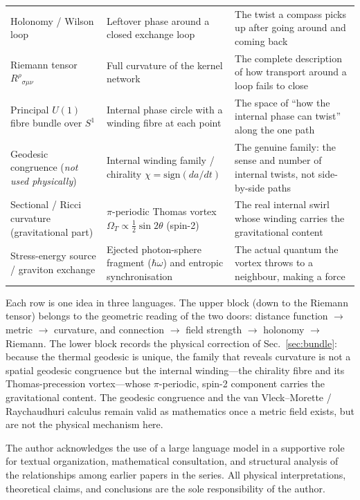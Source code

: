 \documentclass[%
 reprint, amsmath,amssymb, aps, prb, ]{revtex4-2}
\numberwithin{equation}{section}
\begin{document}
\begin{table}[t!]
\begin{tabular}{p{4.6cm}p{5.2cm}p{6.0cm}}
\addlinespace[0.2cm]
Holonomy / Wilson loop
& Leftover phase around a closed exchange loop
& The twist a compass picks up after going around and coming back \\
\addlinespace[0.2cm]
Riemann tensor $R^\rho{}_{\sigma\mu\nu}$
& Full curvature of the kernel network
& The complete description of how transport around a loop fails to close \\
\addlinespace[0.2cm]
Principal $U(1)$ fibre bundle over $S^1$
& Internal phase circle with a winding fibre at each point
& The space of ``how the internal phase can twist'' along the one path \\
\addlinespace[0.2cm]
Geodesic congruence (\emph{not used physically})
& Internal winding family / chirality $\chi=\mathrm{sign}(da/dt)$
& The genuine family: the sense and number of internal twists, not side-by-side paths \\
\addlinespace[0.2cm]
Sectional / Ricci curvature (gravitational part)
& $\pi$-periodic Thomas vortex $\Omega_T\propto\tfrac12\sin 2\theta$ (spin-2)
& The real internal swirl whose winding carries the gravitational content \\
\addlinespace[0.2cm]
Stress-energy source / graviton exchange
& Ejected photon-sphere fragment ($\hbar\omega$) and entropic synchronisation
& The actual quantum the vortex throws to a neighbour, making a force \\
\bottomrule
\end{tabular}
\vspace{0.2cm}
\begin{minipage}{0.95\textwidth}
\justifying\footnotesize
Each row is one idea in three languages. The upper block (down to the Riemann tensor) belongs to the geometric reading of the two doors: distance function $\to$ metric $\to$ curvature, and connection $\to$ field strength $\to$ holonomy $\to$ Riemann. The lower block records the physical correction of Sec.~\ref{sec:bundle}: because the thermal geodesic is unique, the family that reveals curvature is not a spatial geodesic congruence but the internal winding---the chirality fibre and its Thomas-precession vortex---whose $\pi$-periodic, spin-2 component carries the gravitational content. The geodesic congruence and the van Vleck--Morette / Raychaudhuri calculus remain valid as mathematics once a metric field exists, but are not the physical mechanism here.
\end{minipage}
\end{table}

\begin{acknowledgments}
The author acknowledges the use of a large language model in a supportive role for textual organization, mathematical consultation, and structural analysis of the relationships among earlier papers in the series. All physical interpretations, theoretical claims, and conclusions are the sole responsibility of the author.
\end{acknowledgments}
\end{document}
